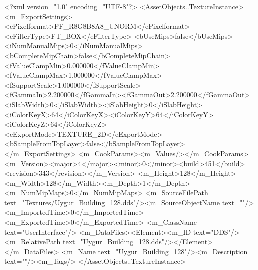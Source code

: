 <?xml version="1.0" encoding="UTF-8"?>
<AssetObjects..TextureInstance>
  <m_ExportSettings>
    <ePixelformat>PF_R8G8B8A8_UNORM</ePixelformat><eFilterType>FT_BOX</eFilterType>
    <bUseMips>false</bUseMips><iNumManualMips>0</iNumManualMips><bCompleteMipChain>false</bCompleteMipChain>
    <fValueClampMin>0.000000</fValueClampMin><fValueClampMax>1.000000</fValueClampMax><fSupportScale>1.000000</fSupportScale>
    <fGammaIn>2.200000</fGammaIn><fGammaOut>2.200000</fGammaOut><iSlabWidth>0</iSlabWidth><iSlabHeight>0</iSlabHeight>
    <iColorKeyX>64</iColorKeyX><iColorKeyY>64</iColorKeyY><iColorKeyZ>64</iColorKeyZ>
    <eExportMode>TEXTURE_2D</eExportMode><bSampleFromTopLayer>false</bSampleFromTopLayer>
  </m_ExportSettings>
  <m_CookParams><m_Values/></m_CookParams>
  <m_Version><major>4</major><minor>0</minor><build>451</build><revision>343</revision></m_Version>
  <m_Height>128</m_Height><m_Width>128</m_Width><m_Depth>1</m_Depth><m_NumMipMaps>0</m_NumMipMaps>
  <m_SourceFilePath text="Textures/Uygur_Building_128.dds"/><m_SourceObjectName text=""/>
  <m_ImportedTime>0</m_ImportedTime><m_ExportedTime>0</m_ExportedTime>
  <m_ClassName text="UserInterface"/>
  <m_DataFiles><Element><m_ID text="DDS"/><m_RelativePath text="Uygur_Building_128.dds"/></Element></m_DataFiles>
  <m_Name text="Uygur_Building_128"/><m_Description text=""/><m_Tags/>
</AssetObjects..TextureInstance>
